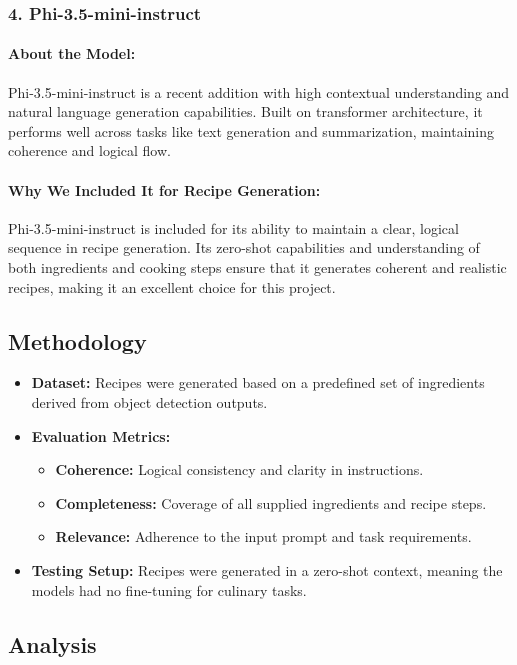 \documentclass[letterpaper,11pt]{report}
\begin{document}
\subsubsection{4. Phi-3.5-mini-instruct}

\paragraph{About the Model:}  
Phi-3.5-mini-instruct is a recent addition with high contextual understanding and natural language generation capabilities. Built on transformer architecture, it performs well across tasks like text generation and summarization, maintaining coherence and logical flow.

\paragraph{Why We Included It for Recipe Generation:}  
Phi-3.5-mini-instruct is included for its ability to maintain a clear, logical sequence in recipe generation. Its zero-shot capabilities and understanding of both ingredients and cooking steps ensure that it generates coherent and realistic recipes, making it an excellent choice for this project.


\subsection{Methodology}
\begin{itemize}
    \item \textbf{Dataset:} Recipes were generated based on a predefined set of ingredients derived from object detection outputs.
    \item \textbf{Evaluation Metrics:}
    \begin{itemize}
        \item \textbf{Coherence:} Logical consistency and clarity in instructions.
        \item \textbf{Completeness:} Coverage of all supplied ingredients and recipe steps.
        \item \textbf{Relevance:} Adherence to the input prompt and task requirements.
    \end{itemize}
    \item \textbf{Testing Setup:} Recipes were generated in a zero-shot context, meaning the models had no fine-tuning for culinary tasks.
\end{itemize}

\subsection{Analysis}
\end{document}
